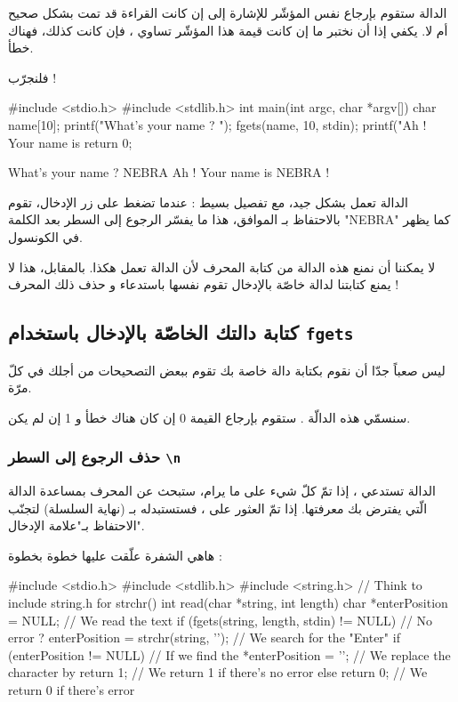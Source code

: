 الدالة ستقوم بإرجاع نفس المؤشّر
للإشارة إلى إن كانت القراءة قد تمت بشكل صحيح أم لا. يكفي إذا أن نختبر ما إن كانت قيمة هذا المؤشّر تساوي
،
فإن كانت كذلك، فهناك خطأ.

فلنجرّب !

\begin{Csource}
#include <stdio.h>
#include <stdlib.h>
int main(int argc, char *argv[])
{
	char name[10];
	printf("What's your name ? ");
	fgets(name, 10, stdin);
	printf("Ah ! Your name is %
	return 0;
}
\end{Csource}

\begin{Console}
What's your name ? NEBRA
Ah ! Your name is NEBRA
!
\end{Console}

الدالة تعمل بشكل جيد، مع تفصيل بسيط : عندما تضغط على زر الإدخال، تقوم
بالاحتفاظ بـ
الموافق، هذا ما يفسّر الرجوع إلى السطر بعد الكلمة
"\textenglish{NEBRA}"
كما يظهر في الكونسول.

لا يمكننا أن نمنع هذه الدالة من كتابة المحرف
لأن الدالة تعمل هكذا. بالمقابل، هذا لا يمنع كتابتنا لدالة خاصّة بالإدخال تقوم نفسها باستدعاء
و حذف ذلك المحرف !

\subsection{كتابة دالتك الخاصّة بالإدخال باستخدام \texttt{fgets}}

ليس صعباً جدّا أن نقوم بكتابة دالة خاصة بك تقوم ببعض التصحيحات من أجلك في كلّ مرّة.

سنسمّي هذه الدالّة
.
ستقوم بإرجاع القيمة 0 إن كان هناك خطأ و 1 إن لم يكن.

\subsubsection{حذف الرجوع إلى السطر \texttt{\textbackslash n}}

الدالة
تستدعي
،
إذا تمّ كلّ شيء على ما يرام، ستبحث عن المحرف
بمساعدة الدالة
الّتي يفترض بك معرفتها. إذا تمّ العثور على
،
فستستبدله بـ
(نهاية السلسلة) لتجنّب الاحتفاظ بـ"علامة الإدخال".

هاهي الشفرة علّقت عليها خطوة بخطوة :

\begin{Csource}
#include <stdio.h>
#include <stdlib.h>
#include <string.h> // Think to include string.h for strchr()
int read(char *string, int length)
{
	char *enterPosition = NULL;
	// We read the text
	if (fgets(string, length, stdin) != NULL)  // No error ?
	{
    		enterPosition = strchr(string, '\n'); // We search for the "Enter"
    		if (enterPosition != NULL) // If we find the \n
    		{
        			*enterPosition = '\0'; // We replace the character by \0
    		}
    		return 1; // We return 1 if there's no error
	}
	else
	 {
    		return 0; // We return 0 if there's error
	 }
}
\end{Csource}

